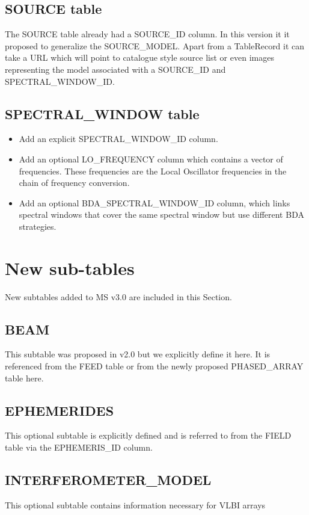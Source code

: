 \documentclass{article}
\begin{document}
\subsection{SOURCE table}

The SOURCE table already had a SOURCE\_ID column.  In this version it
it proposed to generalize the SOURCE\_MODEL. Apart from a TableRecord
it can take a URL which will point to catalogue style source list or
even images representing the model associated with a SOURCE\_ID and
SPECTRAL\_WINDOW\_ID.

\subsection{SPECTRAL\_WINDOW table}

\begin{itemize}
\item Add an explicit SPECTRAL\_WINDOW\_ID column.
\item Add an optional LO\_FREQUENCY column
which contains a vector of frequencies. These frequencies are the Local
Oscillator frequencies in the chain of frequency conversion.
\item Add an optional BDA\_SPECTRAL\_WINDOW\_ID column, which links spectral
windows that cover the same spectral window but use different BDA strategies.
\end{itemize}

\section{New sub-tables}

New subtables added to MS v3.0 are included in this Section.

\subsection{BEAM}
This subtable was proposed in v2.0 but we explicitly define it here.
It is referenced from the FEED table or from the newly proposed
PHASED\_ARRAY table here.

\subsection{EPHEMERIDES}
This optional subtable is explicitly defined and is referred to from the
FIELD table via the EPHEMERIS\_ID column.

\subsection{INTERFEROMETER\_MODEL}
This optional subtable contains information necessary for VLBI arrays
\end{document}
